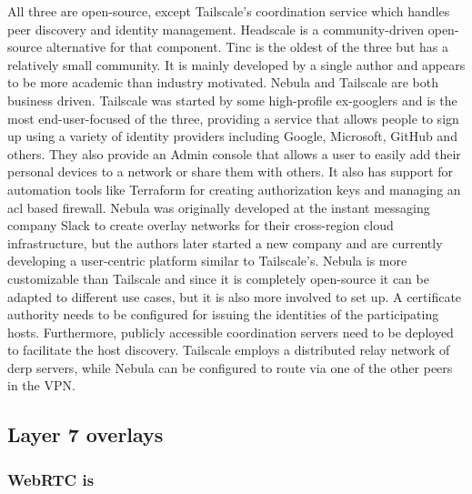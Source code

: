 All three are open-source, except Tailscale's coordination service which
handles peer discovery and identity management. Headscale
\autocite{fontJuanfontHeadscale2022} is a community-driven open-source
alternative for that component. Tinc is the oldest of the three but has
a relatively small community. It is mainly developed by a single author
and appears to be more academic than industry motivated. Nebula and
Tailscale are both business driven. Tailscale was started by some
high-profile ex-googlers and is the most end-user-focused of the three,
providing a service that allows people to sign up using a variety of
identity providers including Google, Microsoft, GitHub and others. They
also provide an Admin console that allows a user to easily add their
personal devices to a network or share them with others. It also has
support for automation tools like Terraform for creating authorization
keys and managing an \gls{acl} based firewall. Nebula was originally
developed at the instant messaging company Slack to create overlay
networks for their cross-region cloud infrastructure, but the authors
later started a new company and are currently developing a user-centric
platform similar to Tailscale's. Nebula is more customizable than
Tailscale and since it is completely open-source it can be adapted to
different use cases, but it is also more involved to set up. A
certificate authority needs to be configured for issuing the identities
of the participating hosts. Furthermore, publicly accessible
coordination servers need to be deployed to facilitate the host
discovery. Tailscale employs a distributed relay network of \gls{derp}
servers, while Nebula can be configured to route via one of the other
peers in the VPN.

\hypertarget{thesis__020-related-work.md__layer-7-overlays}{%
\subsection{Layer 7
overlays}\label{thesis__020-related-work.md__layer-7-overlays}}

\hypertarget{thesis__020-related-work.md__webrtc-is}{%
\subsubsection{WebRTC is}\label{thesis__020-related-work.md__webrtc-is}}

